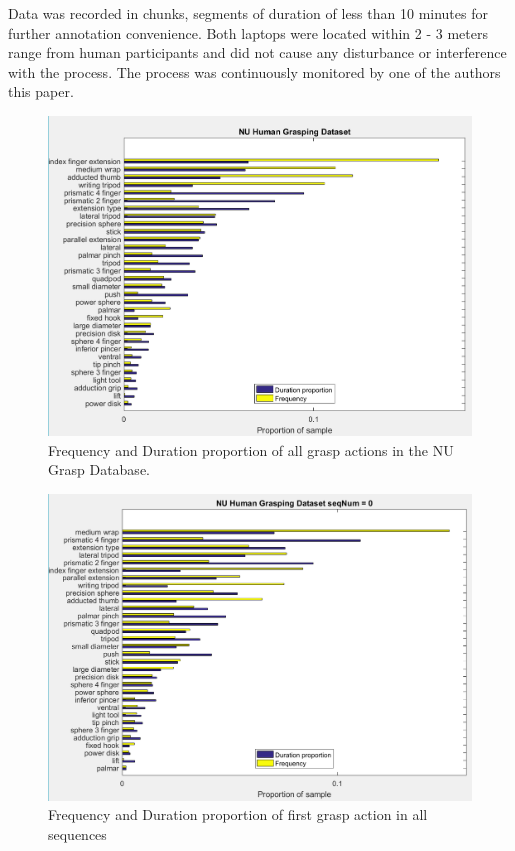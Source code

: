 \documentclass[journal]{IEEEtran}
\begin{document}
Data was recorded in chunks, segments of duration of less than 10 minutes for further annotation convenience. Both laptops were located within 2 - 3 meters range from human participants and did not cause any disturbance or interference with the process. The process was continuously monitored by one of the authors this paper.


\begin{figure}[b]
\includegraphics[scale=0.45]{totalStatAll}
\caption{Frequency and Duration proportion of all grasp actions in the NU Grasp Database.}
\label{fig:totalStatAll}
\centering
\end{figure}

\begin{figure}[b]
\includegraphics[scale=0.45]{totalStatSeqZero}
\caption{Frequency and Duration proportion of first grasp action in all sequences}
\label{fig:totalStatSeqZero}
\centering
\end{figure}
\end{document}
